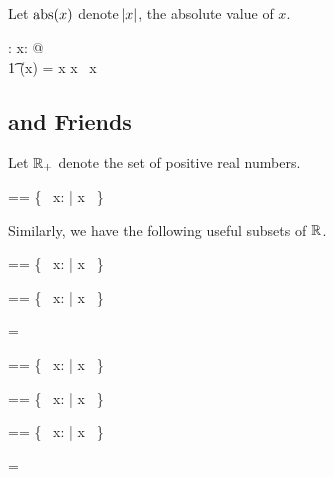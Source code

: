 \documentclass[11pt, oneside]{article}
\begin{document}
\subsection{}

Let $\operatorname{abs}(x)$ denote $\abs{x}$, the absolute value of $x$.

\begin{axdef}
	\absR: \R \fun \R
\where
	\forall x: \R @ \\
	\t1	\absR(x) = \IF x \geR \zeroR \THEN x \ELSE \negR~x
\end{axdef}

\subsection{ and Friends}

Let $\mathbb{R}_{+}$ denote the set of positive real numbers.

\begin{zed}
	\Rpos == \{~ x: \R | x \gtR \zeroR ~\}
\end{zed}

Similarly, we have the following useful subsets of $\mathbb{R}$.

\begin{zed}
	\Rneg == \{~ x: \R | x \ltR \zeroR ~\}
\end{zed}

\begin{zed}
	\Rltz == \{~ x: \R | x \ltR \zeroR ~\}
\end{zed}

\begin{remark}
\begin{zed}
	\Rltz = \Rneg
\end{zed}
\end{remark}

\begin{zed}
	\Rlez == \{~ x: \R | x \leR \zeroR ~\}
\end{zed}

\begin{zed}
	\Rgez == \{~ x: \R | x \geR \zeroR ~\}
\end{zed}

\begin{zed}
	\Rgtz == \{~ x: \R | x \gtR \zeroR ~\}
\end{zed}

\begin{remark}
\begin{zed}
	\Rgtz = \Rpos
\end{zed}
\end{remark}
\end{document}
